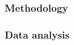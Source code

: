 \documentclass[../main.tex]{subfiles}
\begin{document}
\subsubsection*{Methodology}
\subsubsection*{Data analysis}
\end{document}
